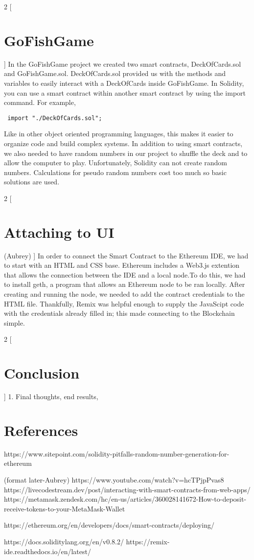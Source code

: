 \documentclass{article}
\begin{document}
\begin{multicols}{2}
[
\section{GoFishGame}
]
In the GoFishGame project we created two smart contracts, DeckOfCards.sol and GoFishGame.sol. DeckOfCards.sol provided us with the methods and variables to easily interact with a DeckOfCards inside GoFishGame. In Solidity, you can use a smart contract within another smart contract by using the import command. For example, \begin{verbatim} import "./DeckOfCards.sol"; \end{verbatim} Like in other object oriented programming languages, this makes it easier to organize code and build complex systems.
In addition to using smart contracts, we also needed to have random numbers in our project to shuffle the deck and to allow the computer to play. Unfortunately, Solidity can not create random numbers. Calculations for pseudo random numbers cost too much so basic solutions are used.  

\end{multicols}
\begin{multicols}{2} [
\section{Attaching to UI} (Aubrey)
]
In order to connect the Smart Contract to the Ethereum IDE, we had to start with an HTML and CSS base. Ethereum includes a Web3.js extention that allows the connection between the IDE and a local node.To do this, we had to install geth, a program that allows an Ethereum node to be ran locally. After creating and running the node, we needed to add the contract credentials to the HTML file. Thankfully, Remix was helpful enough to supply the JavaScipt code with the credentials already filled in; this made connecting to the Blockchain simple.  
\end{multicols}

\begin{multicols}{2} [
\section{Conclusion}
]
1. Final thoughts, end results, 
\end{multicols}


\section{References} 
https://www.sitepoint.com/solidity-pitfalls-random-number-generation-for-ethereum 

(format later-Aubrey)
https://www.youtube.com/watch?v=hcTPjpPvas8 
https://livecodestream.dev/post/interacting-with-smart-contracts-from-web-apps/
https://metamask.zendesk.com/hc/en-us/articles/360028141672-How-to-deposit-receive-tokens-to-your-MetaMask-Wallet

https://ethereum.org/en/developers/docs/smart-contracts/deploying/ 

https://docs.soliditylang.org/en/v0.8.2/
https://remix-ide.readthedocs.io/en/latest/
\end{document}
